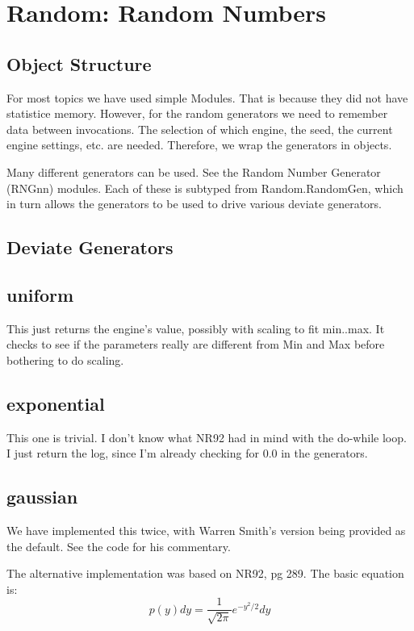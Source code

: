 \section{Random: Random Numbers}
\subsection{Object Structure}
For most topics we have used simple Modules.  
That is because they did not have statistice memory.  However, for
the random generators we need to remember data between invocations.  The
selection of which engine, the seed, the current engine settings, etc.
are needed.  Therefore, we wrap the generators in objects.

Many different generators can be used.  See the Random Number Generator
(RNGnn) modules.  Each of these is subtyped from Random.RandomGen, which
in turn allows the generators to be used to drive various
deviate generators.

\subsection{Deviate Generators}

\subsection*{uniform}
This just returns the engine's value, possibly with scaling to fit
min..max.  It checks to see if the parameters really are different
from Min and Max before bothering to do scaling.

\subsection*{exponential}
This one is trivial.  I don't know what NR92 had in
mind with the do-while loop.  I just return the log, since
I'm already checking for 0.0 in the generators.

\subsection*{gaussian}
We have implemented this twice, with Warren Smith's version being
provided as the default. See the code for his commentary.  

The alternative implementation was based on NR92, pg 289.
The basic equation is:
\begin{equation}
  p(y)dy = \frac{1}{\sqrt{2\pi}}e^{-y^2/2}dy
\end{equation}


